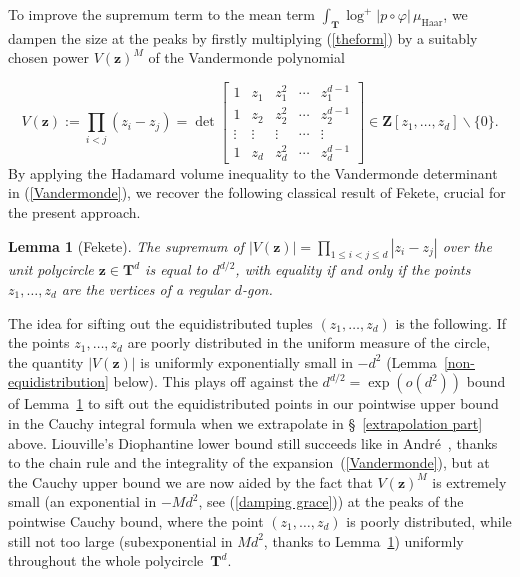 \documentclass[10pt]{amsart}
\def\SSS{\S}
\def\SSSS{\S}
\renewcommand\setminus{\smallsetminus}
\def\T{\mathbf{T}}
\def\Z{\mathbf{Z}}
\newtheorem{lemma}[subsubsection]{Lemma}
\theoremstyle{remark}
\numberwithin{equation}{subsection}
\def\numequation{\addtocounter{subsubsection}{1}\begin{equation}}
\begin{document}
To improve the supremum term to the mean term $\int_{\T} \log^+{|p \circ \varphi|} \, \mu_{\mathrm{Haar}}$, we dampen the size at the peaks by firstly multiplying (\ref{theform}) by a suitably chosen power $V(\mathbf{z})^M$ of the Vandermonde polynomial 
\numequation \label{Vandermonde}
V(\mathbf{z}) := \prod_{i< j}(z_i - z_j) = \det{ \begin{bmatrix} 1 & z_1 & z_1^2 & \cdots & z_1^{d-1} \\ 1 & z_2 & z_2^2 & \cdots & z_2^{d-1} \\
\vdots & \vdots & \vdots & \cdots & \vdots \\
1 & z_d & z_d^2 & \cdots & z_d^{d-1}\end{bmatrix} } \in \Z [z_1, \ldots, z_d] \setminus \{0\}.
\end{equation}
By applying the Hadamard volume inequality to the Vandermonde determinant in (\ref{Vandermonde}), we recover the following classical result of Fekete, crucial for the present approach. 

\begin{lemma}[Fekete] \label{Fekete}
The supremum of $|V(\mathbf{z})| = \prod_{1 \leq i < j \leq d} |z_i-z_j|$ over the unit polycircle $\mathbf{z} \in \T^d$ is equal to $d^{d/2}$, with equality if and only if the points $z_1, \ldots, z_d$ are the vertices of a regular $d$-gon. 
\end{lemma}
 
The idea for sifting out the equidistributed tuples $(z_1, \ldots, z_d)$ is the following. If the points $z_1, \ldots, z_d$ are poorly distributed in the uniform measure of the circle,  the quantity $|V(\mathbf{z})|$ is uniformly exponentially small in $-d^2$ (Lemma~\ref{non-equidistribution} below). This plays off against the $d^{d/2} = \exp(o(d^2))$ bound of Lemma~\ref{Fekete} to sift out the equidistributed points in our pointwise upper bound in the Cauchy integral formula when we extrapolate in \SSSS~\ref{extrapolation part} above. 
Liouville's Diophantine lower bound still succeeds like in Andr\'e~\cite[\SSS5]{Andre}, thanks to the chain rule and the integrality of the expansion~(\ref{Vandermonde}), but at the Cauchy upper bound  we are now aided by the fact that $V( \mathbf{z})^M$ is extremely small (an exponential in $-M d^2$, see (\ref{damping grace})) at the peaks of the pointwise Cauchy bound, where the point $(z_1, \ldots,z_d)$ is poorly distributed, while still not too large (subexponential in $M d^2$, thanks to Lemma~\ref{Fekete}) uniformly throughout the whole polycircle~$\T^d$. 
\end{document}
